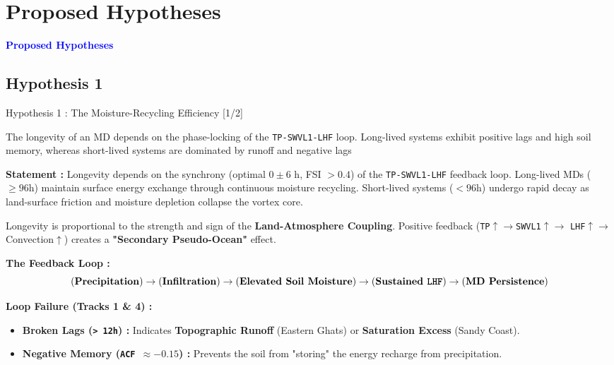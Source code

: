 \documentclass[8pt, aspectratio=169]{beamer}
\begin{document}
\section{Proposed Hypotheses}
\begin{frame}
    \begin{center}
       \Huge \textcolor{blue}{\textbf{Proposed Hypotheses}} \\
    \end{center}
\end{frame}

\subsection{Hypothesis 1}
\begin{frame}{Hypothesis 1 : The Moisture-Recycling Efficiency [1/2]}
    \vspace{-0.1cm}
    \begin{block}{The longevity of an MD depends on the phase-locking of the \texttt{TP-SWVL1-LHF} loop. Long-lived systems exhibit positive lags and high soil memory, whereas short-lived systems are dominated by runoff and negative lags}\end{block}

    \vspace{0.15cm}
    \footnotesize
    \textbf{Statement :} Longevity depends on the synchrony (optimal $0 \pm 6$ h, FSI $>0.4$) of the \texttt{TP-SWVL1-LHF} feedback loop. Long-lived MDs ($\ge 96$h) maintain surface energy exchange through continuous moisture recycling. Short-lived systems ($< 96$h) undergo rapid decay as land-surface friction and moisture depletion collapse the vortex core.

    \vspace{0.2cm}
    \footnotesize
    Longevity is proportional to the strength and sign of the \textbf{Land-Atmosphere Coupling}. Positive feedback (\texttt{TP}$\uparrow \rightarrow$\texttt{SWVL1}$\uparrow \rightarrow$ \texttt{LHF}$\uparrow \rightarrow$ Convection$\uparrow$) creates a \textbf{"Secondary Pseudo-Ocean"} effect. \cite{hunt2017effect}

    \vspace{0.2cm}
    \footnotesize
    \textbf{The Feedback Loop :} 
    \[ \text{(\textbf{Precipitation})} \rightarrow \text{(\textbf{Infiltration})} \rightarrow \text{(\textbf{Elevated Soil Moisture})} \rightarrow \text{(\textbf{Sustained \texttt{LHF}})} \rightarrow \text{(\textbf{MD Persistence})} \]

    \vspace{0.2cm}
    \footnotesize
    \textbf{Loop Failure (Tracks 1 \& 4) :}
    \begin{itemize}
        \item \textbf{Broken Lags (\texttt{> 12h}) :} Indicates \textbf{Topographic Runoff} (Eastern Ghats) or \textbf{Saturation Excess} (Sandy Coast).
        \item \textbf{Negative Memory (\texttt{ACF $\approx -0.15$}) :} Prevents the soil from "storing" the energy recharge from precipitation.
    \end{itemize}
\end{frame}
\end{document}
